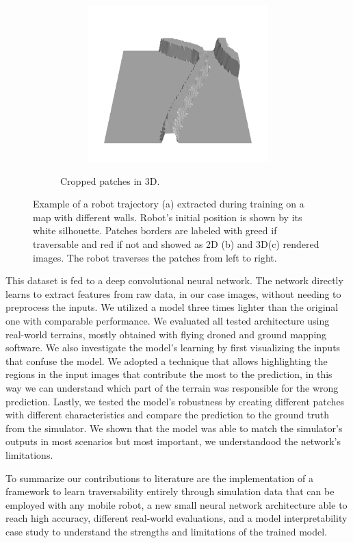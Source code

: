 \documentclass[../document.tex]{subfiles}
\begin{document}
\begin{figure}[H]
\begin{subfigure}[b]{1\textwidth}
\begin{subfigure}[b]{0.19\textwidth}
    \includegraphics[width=\linewidth]{../img/bars1-example-patches/3d/14.png}    
    \end{subfigure}  
\caption{Cropped patches in 3D.}
\label{fig : patch-extraction}
\end{subfigure}
\caption{Example of a robot trajectory (a) extracted during training on a map with different walls. Robot's initial position is shown by its white silhouette. Patches borders are labeled with greed if traversable and red if not and showed as 2D (b) and 3D(c) rendered images. The robot traverses the patches from left to right.}
\end{figure}

This dataset is fed to a deep convolutional neural network. The network directly learns to extract features from raw data, in our case images, without needing to preprocess the inputs. We utilized a model three times lighter than the original one with comparable performance. We evaluated all tested architecture using real-world terrains, mostly obtained with flying droned and ground mapping software. 
We also investigate the model's learning by first visualizing the inputs that confuse the model. We adopted a technique that allows highlighting the regions in the input images that contribute the most to the prediction, in this way we can understand which part of the terrain was responsible for the wrong prediction. Lastly, we tested the model's robustness by creating different patches with different characteristics and compare the prediction to the ground truth from the simulator. We shown that the model was able to match the simulator's outputs in most scenarios but most important, we understandood the network's limitations.

To summarize our contributions to literature are the implementation of a framework to learn traversability entirely through simulation data that can be employed with any mobile robot, a new small neural network architecture able to reach high accuracy, different real-world evaluations, and a model interpretability case study to understand the strengths and limitations of the trained model. 
\end{document}
